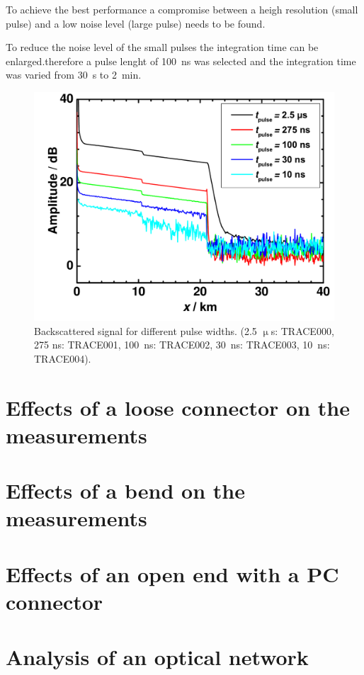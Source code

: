 To achieve the best performance a compromise between a heigh resolution (small pulse) and a low noise level (large pulse) needs to be found.

To reduce the noise level of the small pulses the integration time can be enlarged.therefore a pulse lenght of 100~ns was selected and the integration time was varied from 30~s to 2~min. 


\begin{figure}%
\centering
\includegraphics[width=.6\columnwidth]{grafiken/1_time.pdf}%
\caption{Backscattered signal for different pulse widths. (2.5 $\upmu$s: TRACE000, 275 ns: TRACE001, 100~ns: TRACE002, 30~ns: TRACE003, 10~ns: TRACE004).}%
\label{fig:1_time}%
\end{figure}
% 
%
%
%
%




\section{Effects of a loose connector on the measurements}


\section{Effects of a bend on the measurements}

\section{Effects of an open end with a PC connector}

\section{Analysis of an optical network}



